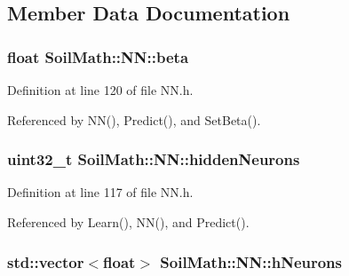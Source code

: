 \subsection{Member Data Documentation}
\hypertarget{class_soil_math_1_1_n_n_a4bb773955d78fa6f064b39a9149b78c8}{}
\subsubsection[{beta}]{\setlength{\rightskip}{0pt plus 5cm}float Soil\+Math\+::\+N\+N\+::beta\hspace{0.3cm}{\ttfamily [private]}}\label{class_soil_math_1_1_n_n_a4bb773955d78fa6f064b39a9149b78c8}


Definition at line 120 of file N\+N.\+h.



Referenced by N\+N(), Predict(), and Set\+Beta().

\hypertarget{class_soil_math_1_1_n_n_aedf4b2ddaae281d83e666c308e5d67c4}{}
\subsubsection[{hidden\+Neurons}]{\setlength{\rightskip}{0pt plus 5cm}uint32\+\_\+t Soil\+Math\+::\+N\+N\+::hidden\+Neurons\hspace{0.3cm}{\ttfamily [private]}}\label{class_soil_math_1_1_n_n_aedf4b2ddaae281d83e666c308e5d67c4}


Definition at line 117 of file N\+N.\+h.



Referenced by Learn(), N\+N(), and Predict().

\hypertarget{class_soil_math_1_1_n_n_a459bde01ce33e0b27803cbe4a3b114b4}{}
\subsubsection[{h\+Neurons}]{\setlength{\rightskip}{0pt plus 5cm}std\+::vector$<$float$>$ Soil\+Math\+::\+N\+N\+::h\+Neurons\hspace{0.3cm}{\ttfamily [private]}}\label{class_soil_math_1_1_n_n_a459bde01ce33e0b27803cbe4a3b114b4}


